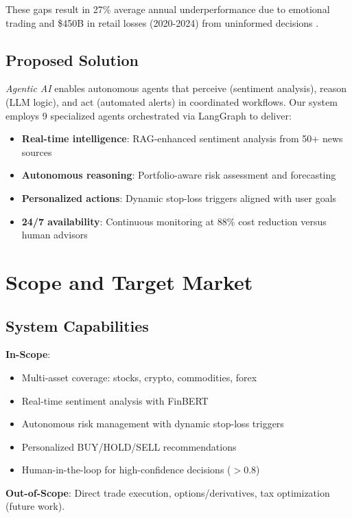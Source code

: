 \documentclass[conference]{IEEEtran}
\begin{document}
    These gaps result in 27\% average annual underperformance due to emotional trading \cite{dalbar2024} and \$450B in retail losses (2020-2024) from uninformed decisions \cite{sec_report_2024}.

    \subsection{Proposed Solution}
    \textit{Agentic AI} \cite{langchain2024} enables autonomous agents that perceive (sentiment analysis), reason (LLM logic), and act (automated alerts) in coordinated workflows. Our system employs 9 specialized agents orchestrated via LangGraph \cite{langgraph2024} to deliver:
    \begin{itemize}
        \item \textbf{Real-time intelligence}: RAG-enhanced sentiment analysis from 50+ news sources
        \item \textbf{Autonomous reasoning}: Portfolio-aware risk assessment and forecasting
        \item \textbf{Personalized actions}: Dynamic stop-loss triggers aligned with user goals
        \item \textbf{24/7 availability}: Continuous monitoring at 88\% cost reduction versus human advisors
    \end{itemize}

    \section{Scope and Target Market}

    \subsection{System Capabilities}
    \textbf{In-Scope}:
    \begin{itemize}
        \item Multi-asset coverage: stocks, crypto, commodities, forex
        \item Real-time sentiment analysis with FinBERT \cite{finbert2020}
        \item Autonomous risk management with dynamic stop-loss triggers
        \item Personalized BUY/HOLD/SELL recommendations
        \item Human-in-the-loop for high-confidence decisions ($>$0.8)
    \end{itemize}

    \textbf{Out-of-Scope}: Direct trade execution, options/derivatives, tax optimization (future work).
\end{document}
